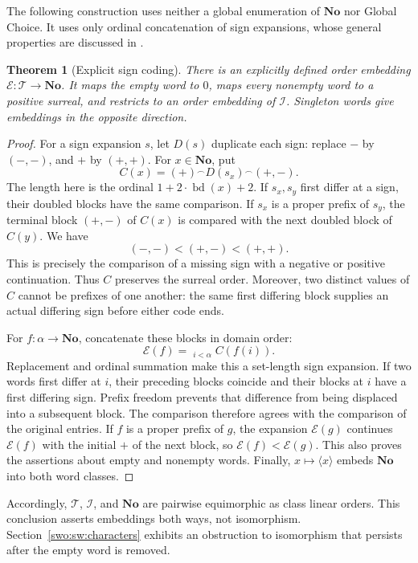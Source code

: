 \documentclass[11pt]{article}
\newtheorem{theorem}{Theorem}[section]
\theoremstyle{definition}
\theoremstyle{remark}
\newcommand{\No}{\mathbf{No}}
\newcommand{\Words}{\mathcal I}
\newcommand{\WordsAll}{\mathcal T}
\newcommand{\bd}{\operatorname{bd}}
\newcommand{\cat}{\mathbin{{}^\frown}}
\begin{document}
The following construction uses neither a global enumeration of
\(\No\) nor Global Choice.  It uses only ordinal concatenation
of sign expansions, whose general properties are discussed in
\cite[Section 3.2]{BagayokoHoeven}.

\begin{theorem}[Explicit sign coding]\label{swo:sw:code}
There is an explicitly defined order embedding
\(\mathcal E:\WordsAll\longrightarrow\No\).
It maps the empty word to \(0\), maps every nonempty word to
a positive surreal, and restricts to an order embedding
of \(\Words\).
Singleton words give embeddings in the opposite direction.
\end{theorem}

\begin{proof}
For a sign expansion \(s\), let \(D(s)\) duplicate each sign:
replace \(-\) by \((-,-)\), and \(+\) by \((+,+)\).
For \(x\in\No\), put
\[
               C(x)=(+)\cat D(s_x)\cat(+,-).
\]
The length here is the ordinal
\(1+2\cdot\bd(x)+2\).
If \(s_x,s_y\) first differ at a sign, their doubled blocks
have the same comparison.  If \(s_x\) is a proper prefix of
\(s_y\), the terminal block \((+,-)\) of \(C(x)\) is compared
with the next doubled block of \(C(y)\).  We have
\[
                  (-,-)<(+,-)<(+,+).
\]
This is precisely the comparison of a missing sign with a
negative or positive continuation.  Thus \(C\) preserves
the surreal order.  Moreover, two distinct values of \(C\)
cannot be prefixes of one another: the same first differing
block supplies an actual differing sign before either code ends.

For \(f:\alpha\to\No\), concatenate these blocks in domain order:
\[
        \mathcal E(f)=\mathop{\cat}_{i<\alpha}C(f(i)).
\]
Replacement and ordinal summation make this a set-length sign
expansion.  If two words first differ at \(i\), their preceding
blocks coincide and their blocks at \(i\) have a first differing
sign.  Prefix freedom prevents that difference from being
displaced into a subsequent block.  The comparison therefore
agrees with the comparison of the original entries.
If \(f\) is a proper prefix of \(g\), the expansion
\(\mathcal E(g)\) continues \(\mathcal E(f)\) with the initial
\(+\) of the next block, so \(\mathcal E(f)<\mathcal E(g)\).
This also proves the assertions about empty and nonempty words.
Finally, \(x\mapsto\langle x\rangle\) embeds \(\No\) into
both word classes.
\end{proof}

Accordingly, \(\WordsAll\), \(\Words\), and \(\No\) are pairwise
equimorphic as class linear orders.  This conclusion asserts
embeddings both ways, not isomorphism.  Section~\ref{swo:sw:characters}
exhibits an obstruction to isomorphism that persists after
the empty word is removed.
\end{document}
